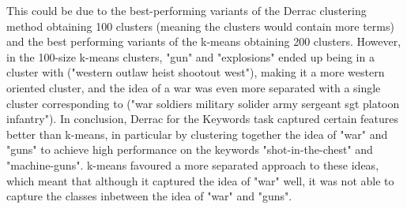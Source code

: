This could be due to the best-performing variants of the Derrac clustering method obtaining 100 clusters (meaning the clusters would contain more terms) and the best performing variants of the k-means obtaining 200 clusters. However, in the 100-size k-means clusters, "gun" and "explosions" ended up being in a cluster with ("western outlaw heist shootout west"), making it a more western oriented cluster, and the idea of a war was even more separated with a single cluster corresponding to ("war soldiers military solider army sergeant sgt platoon infantry"). In conclusion, Derrac for the Keywords task captured certain features better than k-means, in particular by clustering together the idea of "war" and "guns" to achieve high performance on the keywords "shot-in-the-chest" and "machine-guns". k-means favoured a more separated approach to these ideas, which meant that although it captured the idea of "war" well, it was not able to capture the classes inbetween the idea of "war" and "guns".
